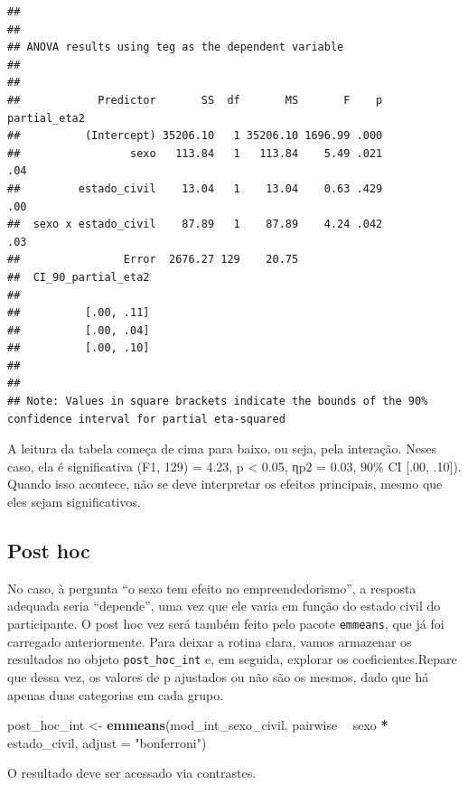 \documentclass[
]{book}
\newenvironment{Shaded}{\begin{snugshade}}{\end{snugshade}}
\newcommand{\DataTypeTok}[1]{\textcolor[rgb]{0.13,0.29,0.53}{#1}}
\newcommand{\KeywordTok}[1]{\textcolor[rgb]{0.13,0.29,0.53}{\textbf{#1}}}
\newcommand{\NormalTok}[1]{#1}
\newcommand{\OperatorTok}[1]{\textcolor[rgb]{0.81,0.36,0.00}{\textbf{#1}}}
\newcommand{\StringTok}[1]{\textcolor[rgb]{0.31,0.60,0.02}{#1}}
\begin{document}
\begin{verbatim}
## 
## 
## ANOVA results using teg as the dependent variable
##  
## 
##            Predictor       SS  df       MS       F    p partial_eta2
##          (Intercept) 35206.10   1 35206.10 1696.99 .000             
##                 sexo   113.84   1   113.84    5.49 .021          .04
##         estado_civil    13.04   1    13.04    0.63 .429          .00
##  sexo x estado_civil    87.89   1    87.89    4.24 .042          .03
##                Error  2676.27 129    20.75                          
##  CI_90_partial_eta2
##                    
##          [.00, .11]
##          [.00, .04]
##          [.00, .10]
##                    
## 
## Note: Values in square brackets indicate the bounds of the 90% confidence interval for partial eta-squared
\end{verbatim}

A leitura da tabela começa de cima para baixo, ou seja, pela interação. Neses caso, ela é significativa (F1, 129) = 4.23, p \textless{} 0.05, ηp2 = 0.03, 90\% CI {[}.00, .10{]}). Quando isso acontece, não se deve interpretar os efeitos principais, mesmo que eles sejam significativos.

\hypertarget{post-hoc-1}{%
\subsection{Post hoc}\label{post-hoc-1}}

No caso, à pergunta ``o sexo tem efeito no empreendedorismo'', a resposta adequada seria ``depende'', uma vez que ele varia em função do estado civil do participante. O post hoc vez será também feito pelo pacote \texttt{emmeans}, que já foi carregado anteriormente. Para deixar a rotina clara, vamos armazenar os resultados no objeto \texttt{post\_hoc\_int} e, em seguida, explorar os coeficientes.Repare que dessa vez, os valores de p ajustados ou não são os mesmos, dado que há apenas duas categorias em cada grupo.

\begin{Shaded}
\begin{Highlighting}[]
\NormalTok{post_hoc_int <-}\StringTok{ }\KeywordTok{emmeans}\NormalTok{(mod_int_sexo_civil, pairwise }\OperatorTok{~}\StringTok{ }\NormalTok{sexo }\OperatorTok{*}\StringTok{ }\NormalTok{estado_civil, }\DataTypeTok{adjust =} \StringTok{"bonferroni"}\NormalTok{)}
\end{Highlighting}
\end{Shaded}

O resultado deve ser acessado via contrastes.
\end{document}
